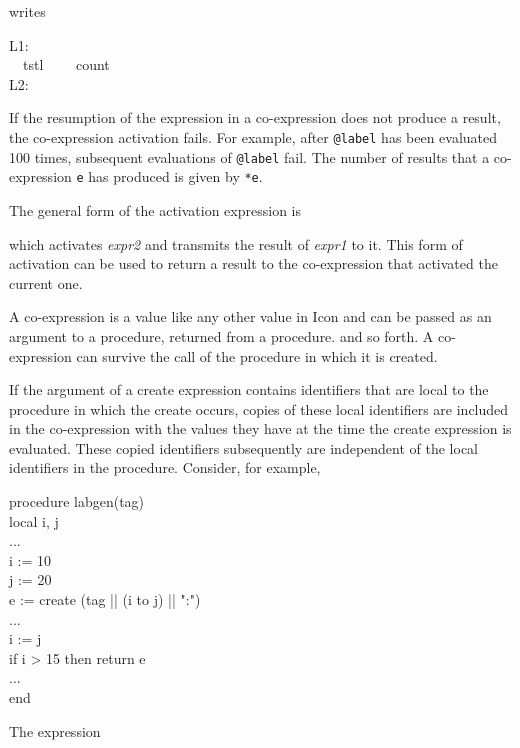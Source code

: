 \noindent writes

\begin{iconcode}
\>L1:\\
\>\>\ \ tstl \ \ \ \ count\\
\>L2:
\end{iconcode}

If the resumption of the expression in a co-expression does not
produce a result, the co-expression activation fails.  For example,
after \texttt{@label} has been evaluated 100 times, subsequent
evaluations of \texttt{@label} fail. The number of results that a
co-expression \texttt{e} has produced is given by \texttt{*e}.

The general form of the activation expression is


\noindent which activates \textit{expr2} and transmits the result of
\textit{expr1} to it. This form of activation can be used to return a
result to the co-expression that activated the current one.

A co-expression is a value like any other value in Icon and can be
passed as an argument to a procedure, returned from a procedure. and
so forth. A co-expression can survive the call of the procedure in
which it is created.

If the argument of a create expression contains identifiers that are
local to the procedure in which the create occurs, copies of these
local identifiers are included in the co-expression with the values
they have at the time the create expression is evaluated. These copied
identifiers subsequently are independent of the local identifiers in
the procedure. Consider, for example,

\begin{iconcode}
procedure labgen(tag)\\
\>local i, j\\
\> ...\\
\> i := 10\\
\> j := 20\\
\> e := create (tag || (i to j) || ":")\\
\> ...\\
\> i := j\\
\> if i > 15 then return e\\
\> ...\\
end
\end{iconcode}

The expression

